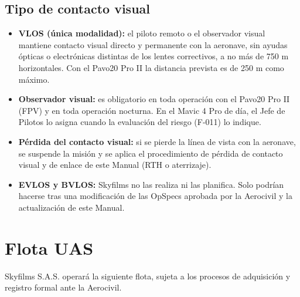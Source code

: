\subsection{Tipo de contacto visual}
\begin{itemize}
\item \textbf{VLOS (única modalidad):} el piloto remoto o el observador visual mantiene contacto visual directo y permanente con la aeronave, sin ayudas ópticas o electrónicas distintas de los lentes correctivos, a no más de 750 m horizontales. Con el Pavo20 Pro II la distancia prevista es de 250 m como máximo.
\item \textbf{Observador visual:} es obligatorio en toda operación con el Pavo20 Pro II (FPV) y en toda operación nocturna. En el Mavic 4 Pro de día, el Jefe de Pilotos lo asigna cuando la evaluación del riesgo (F-011) lo indique.
\item \textbf{Pérdida del contacto visual:} si se pierde la línea de vista con la aeronave, se suspende la misión y se aplica el procedimiento de pérdida de contacto visual y de enlace de este Manual (RTH o aterrizaje).
\item \textbf{EVLOS y BVLOS:} Skyfilms no las realiza ni las planifica. Solo podrían hacerse tras una modificación de las OpSpecs aprobada por la Aerocivil y la actualización de este Manual.
\end{itemize}

\section{Flota UAS}
Skyfilms S.A.S. operará la siguiente flota, sujeta a los procesos de adquisición y registro formal ante la Aerocivil.

